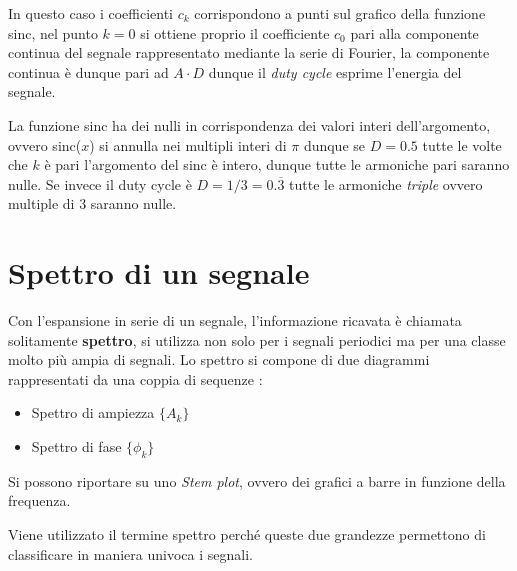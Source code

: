 In questo caso i coefficienti $c_k$ corrispondono a punti sul grafico della
funzione sinc, nel punto $k=0$ si ottiene proprio il coefficiente $c_0$ pari
alla componente continua del segnale rappresentato mediante la serie di
Fourier, la componente continua è dunque pari ad $A\cdot D$ dunque il
\textit{duty cycle} esprime l'energia del segnale.

La funzione sinc ha dei
nulli in corrispondenza dei valori interi dell'argomento, ovvero sinc($x$) si
annulla nei multipli interi di $\pi$ dunque se $D = 0.5$ tutte le volte che $k$
è pari l'argomento del sinc è intero, dunque tutte le armoniche pari saranno
nulle.
Se invece il duty cycle è $D=1/3 = 0.\overline{3}$ tutte le armoniche
\textit{triple} ovvero multiple di 3 saranno nulle.

\section{Spettro di un segnale}
Con l'espansione in serie di un segnale, l'informazione ricavata è chiamata
solitamente \textbf{spettro}, si utilizza non solo per i segnali periodici ma
per una classe molto più ampia di segnali.
Lo spettro si compone di due diagrammi rappresentati da una coppia di sequenze :
\begin{itemize}
 \item Spettro di ampiezza $\{A_k\} $
 \item Spettro di fase $\{\phi_k\}$
\end{itemize}

Si possono riportare su uno \textit{Stem plot}, ovvero dei grafici a barre in
funzione della frequenza.

Viene utilizzato il termine spettro perché queste due grandezze permettono di
classificare in maniera univoca i segnali.
